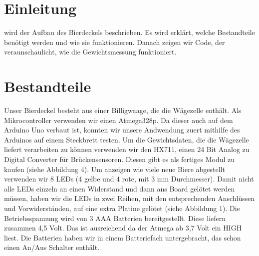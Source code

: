 \documentclass[12pt,journal,compsoc]{IEEEtran}
\begin{document}
\section{Einleitung}

% 
% 
% 
% 
 wird der Aufbau des Bierdeckels beschrieben.
Es wird erklärt, welche Bestandteile benötigt werden und wie sie funktionieren.
Danach zeigen wir Code, der veraunschaulicht, wie die Gewichtsmessung funktioniert.


\section{Bestandteile}

Unser Bierdeckel besteht aus einer Billigwaage, die die Wägezelle enthält.
Als Mikrocontroller verwenden wir einen Atmega328p. Da dieser auch auf dem Arduino Uno verbaut
ist, konnten wir unsere Andwendung zuert mithilfe des Arduinos auf einem Steckbrett testen.
Um die Gewichtsdaten, die die Wägezelle liefert verarbeiten zu können verwenden wir den HX711,
einen 24 Bit Analog zu Digital Converter für Brückensensoren. Diesen gibt es als fertiges Modul
zu kaufen (siehe Abbildung 4). Um anzeigen wie viele neue Biere abgestellt verwenden wir 8 LEDs
(4 gelbe und 4 rote, mit 3 mm Durchmesser). Damit nicht alle LEDs einzeln an einen Widerstand
und dann ans Board gelötet werden müssen, haben wir die LEDs in zwei Reihen, mit den
entsprechenden Anschlüssen und Vorwiderständen, auf eine extra Platine gelötet (siehe Abbildung 1).
Die Betriebsspannung wird von 3 AAA Batterien bereitgestellt. Diese liefern zusammen 4,5 Volt.
Das ist ausreichend da der Atmega ab 3,7 Volt ein HIGH liest. Die Batterien haben wir in einem
Batteriefach untergebracht, das schon einen An/Aus Schalter enthält.
\end{document}
